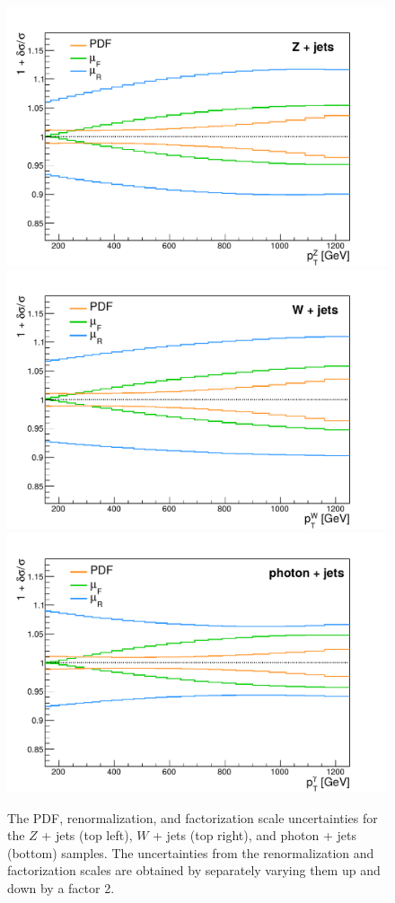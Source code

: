 \begin{figure}[ht]
  \centering
 \includegraphics[width=.49\textwidth]{Z_uncertainties_smooth.pdf} 
 \includegraphics[width=.49\textwidth]{W_uncertainties_smooth_new.pdf} \\
 \includegraphics[width=.49\textwidth]{gamma_uncertainties_smooth.pdf} 
 \caption{The PDF, renormalization, and factorization scale uncertainties for the $Z$ + jets (top left), $W$ + jets (top right), and photon + jets (bottom) samples. The uncertainties from the renormalization and factorization scales are obtained by separately varying them up and down by a factor 2.}
 \label{fig:kfactors_unc}
\end{figure}


